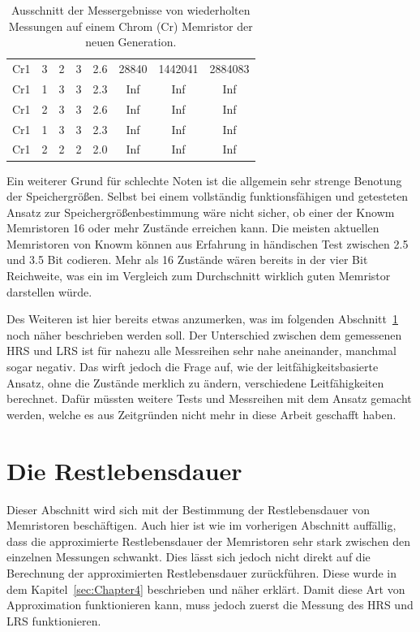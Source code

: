 \begin{table}
\begin{tabular}{l|c|c|c|c|c|c|c}
      Cr1          &  3               & 2                &  3               &  2.6           & 28840          & 1442041        & 2884083 \\
      Cr1          &  1               & 3                &  3               &  2.3           & Inf            & Inf            & Inf     \\
      Cr1          &  2               & 3                &  3               &  2.6           & Inf            & Inf            & Inf     \\
      Cr1          &  1               & 3                &  3               &  2.3           & Inf            & Inf            & Inf     \\
      Cr1          &  2               & 2                &  2               &  2.0           & Inf            & Inf            & Inf     \\
    \end{tabular}
  \caption{Ausschnitt der Messergebnisse von wiederholten Messungen auf einem Chrom (Cr) Memristor der neuen Generation.}
  \label{tab:Messergebnisse_Cr}
\end{table}

Ein weiterer Grund für schlechte Noten ist die allgemein sehr strenge Benotung der Speichergrößen. Selbst bei einem vollständig funktionsfähigen und getesteten Ansatz zur Speichergrößenbestimmung wäre nicht sicher, ob einer der Knowm Memristoren 16 oder mehr Zustände erreichen kann. Die meisten aktuellen Memristoren von Knowm können aus Erfahrung in händischen Test zwischen 2.5 und 3.5 Bit codieren. Mehr als 16 Zustände wären bereits in der vier Bit Reichweite, was ein im Vergleich zum Durchschnitt wirklich guten Memristor darstellen würde.

Des Weiteren ist hier bereits etwas anzumerken, was im folgenden Abschnitt~\ref{sec:Restlebensdauer} noch näher beschrieben werden soll. Der Unterschied zwischen dem gemessenen HRS und LRS ist für nahezu alle Messreihen sehr nahe aneinander, manchmal sogar negativ. Das wirft jedoch die Frage auf, wie der leitfähigkeitsbasierte Ansatz, ohne die Zustände merklich zu ändern, verschiedene Leitfähigkeiten berechnet. Dafür müssten weitere Tests und Messreihen mit dem Ansatz gemacht werden, welche es aus Zeitgründen nicht mehr in diese Arbeit geschafft haben.

\section{Die Restlebensdauer}
\label{sec:Restlebensdauer}
Dieser Abschnitt wird sich mit der Bestimmung der Restlebensdauer von Memristoren beschäftigen. Auch hier ist wie im vorherigen Abschnitt auffällig, dass die approximierte Restlebensdauer der Memristoren sehr stark zwischen den einzelnen Messungen schwankt. Dies lässt sich jedoch nicht direkt auf die Berechnung der approximierten Restlebensdauer zurückführen. Diese wurde in dem Kapitel~\ref{sec:Chapter4} beschrieben und näher erklärt. Damit diese Art von Approximation funktionieren kann, muss jedoch zuerst die Messung des HRS und LRS funktionieren.

